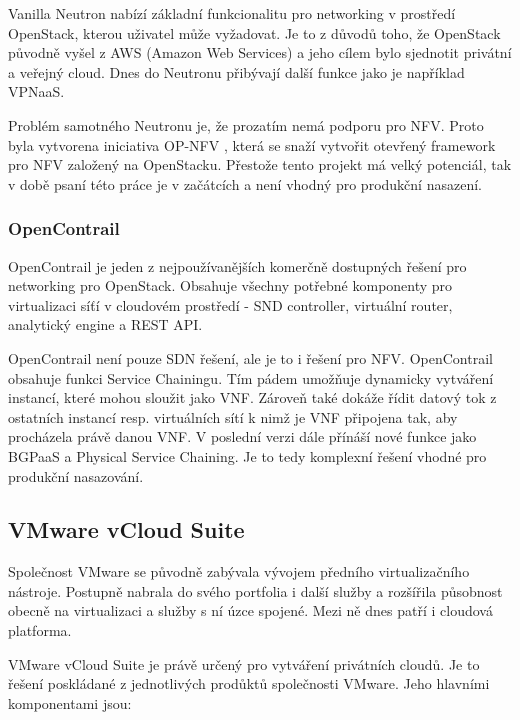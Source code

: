 Vanilla Neutron nabízí základní funkcionalitu pro networking v prostředí OpenStack, kterou uživatel může vyžadovat. Je to z důvodů toho, že OpenStack původně vyšel z AWS (Amazon Web Services) a jeho cílem bylo sjednotit privátní a veřejný cloud. Dnes do Neutronu přibývají další funkce jako je například VPNaaS.

Problém samotného Neutronu je, že prozatím nemá podporu pro NFV. Proto byla vytvorena iniciativa OP-NFV \cite{opnfv} , která se snaží vytvořit otevřený framework pro NFV založený na OpenStacku. Přestože tento projekt má velký potenciál, tak v době psaní této práce je v začátcích a není vhodný pro produkční nasazení.

\subsubsection{OpenContrail} 

OpenContrail je jeden z nejpoužívanějších komerčně dostupných řešení pro networking pro OpenStack. Obsahuje všechny potřebné komponenty pro virtualizaci síťí v cloudovém prostředí - SND controller, virtuální router, analytický engine a REST API. \cite{OpenContrail}

OpenContrail není pouze SDN řešení, ale je to i řešení pro NFV. OpenContrail obsahuje funkci Service Chainingu. Tím pádem umožňuje dynamicky vytváření instancí, které mohou sloužit jako VNF. Zároveň také dokáže řídit datový tok z ostatních instancí resp. virtuálních sítí k nimž je VNF připojena tak, aby procházela právě danou VNF. V poslední verzi dále přínáší nové funkce jako BGPaaS a Physical Service Chaining. Je to tedy komplexní řešení vhodné pro produkční nasazování. 

\subsection{VMware vCloud Suite}

Společnost VMware \cite{vmware_web} se původně zabývala vývojem předního virtualizačního nástroje. Postupně nabrala do svého portfolia i další služby a rozšířila působnost obecně na virtualizaci a služby s ní úzce spojené. Mezi ně dnes patří i cloudová platforma. 

VMware vCloud Suite je právě určený pro vytváření privátních cloudů. Je to řešení poskládané z jednotlivých prodůktů společnosti VMware. Jeho hlavními komponentami jsou:

